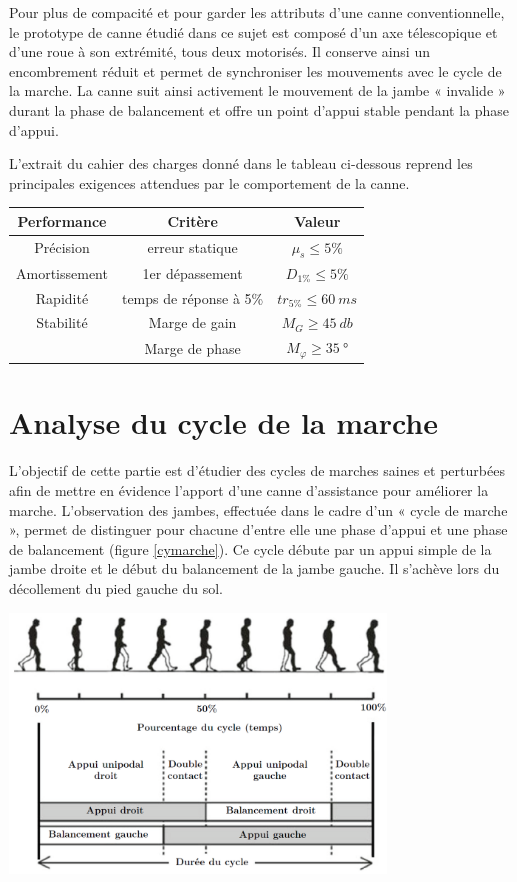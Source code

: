 Pour plus de compacité et pour garder les attributs d'une canne conventionnelle, le prototype de canne étudié dans ce sujet est composé d'un axe télescopique et d'une roue à son extrémité, tous deux motorisés. Il conserve ainsi un encombrement réduit et permet de synchroniser les mouvements avec le cycle de la marche. La canne suit ainsi activement le mouvement de la jambe « invalide » durant la phase de balancement et offre un point d'appui stable pendant la phase d'appui.

L'extrait du cahier des charges donné dans le tableau ci-dessous reprend les principales exigences attendues par le comportement de la canne.

\begin{center}
\begin{tabular}{|c|c|c|}\hline
\textbf{Performance} & \textbf{Critère} & \textbf{Valeur}\\\hline
Précision & erreur statique & $\mu_s\leq 5\%$ \\\hline
Amortissement & 1er dépassement & $D_{1\%}\leq 5\%$ \\\hline
Rapidité & temps de réponse à 5\% & $tr_{5\%}\leq \SI{60}{ms}$ \\\hline
Stabilité & Marge de gain & $M_G \geq \SI{45}{db}$\\
 & Marge de phase  & $M_\varphi \geq \SI{35}{\degree}$\\\hline
\end{tabular}
\end{center}
\section{Analyse du cycle de la marche}

L'objectif de cette partie est d'étudier des cycles de marches saines et perturbées afin de mettre en évidence l'apport d'une canne d'assistance pour améliorer la marche. L'observation des jambes, effectuée dans le cadre d'un « cycle de marche », permet de distinguer pour chacune d'entre elle une phase d'appui et une phase de balancement (figure \ref{cymarche}). Ce cycle débute par un appui simple de la jambe droite et le début du balancement de la jambe gauche. Il s'achève lors du décollement du pied gauche du sol.

\begin{center}
\includegraphics[width=10cm]{img/marche}
\end{center}

